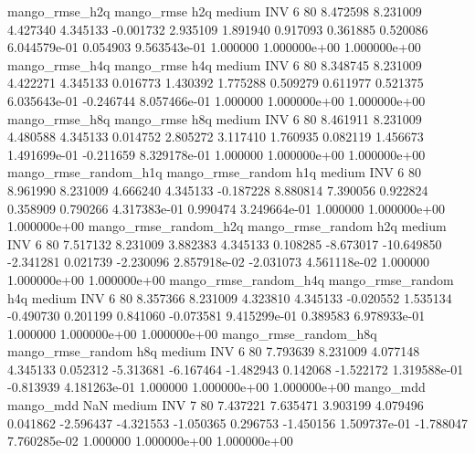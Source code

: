        mango_rmse_h2q        mango_rmse                  h2q     medium      INV                 6 80  8.472598       8.231009 4.427340       4.345133   -0.001732      2.935109      1.891940     0.917093       0.361885  0.520086 6.044579e-01     0.054903   9.563543e-01            1.000000    1.000000e+00        1.000000e+00
       mango_rmse_h4q        mango_rmse                  h4q     medium      INV                 6 80  8.348745       8.231009 4.422271       4.345133    0.016773      1.430392      1.775288     0.509279       0.611977  0.521375 6.035643e-01    -0.246744   8.057466e-01            1.000000    1.000000e+00        1.000000e+00
       mango_rmse_h8q        mango_rmse                  h8q     medium      INV                 6 80  8.461911       8.231009 4.480588       4.345133    0.014752      2.805272      3.117410     1.760935       0.082119  1.456673 1.491699e-01    -0.211659   8.329178e-01            1.000000    1.000000e+00        1.000000e+00
mango_rmse_random_h1q mango_rmse_random                  h1q     medium      INV                 6 80  8.961990       8.231009 4.666240       4.345133   -0.187228      8.880814      7.390056     0.922824       0.358909  0.790266 4.317383e-01     0.990474   3.249664e-01            1.000000    1.000000e+00        1.000000e+00
mango_rmse_random_h2q mango_rmse_random                  h2q     medium      INV                 6 80  7.517132       8.231009 3.882383       4.345133    0.108285     -8.673017    -10.649850    -2.341281       0.021739 -2.230096 2.857918e-02    -2.031073   4.561118e-02            1.000000    1.000000e+00        1.000000e+00
mango_rmse_random_h4q mango_rmse_random                  h4q     medium      INV                 6 80  8.357366       8.231009 4.323810       4.345133   -0.020552      1.535134     -0.490730     0.201199       0.841060 -0.073581 9.415299e-01     0.389583   6.978933e-01            1.000000    1.000000e+00        1.000000e+00
mango_rmse_random_h8q mango_rmse_random                  h8q     medium      INV                 6 80  7.793639       8.231009 4.077148       4.345133    0.052312     -5.313681     -6.167464    -1.482943       0.142068 -1.522172 1.319588e-01    -0.813939   4.181263e-01            1.000000    1.000000e+00        1.000000e+00
            mango_mdd         mango_mdd                  NaN     medium      INV                 7 80  7.437221       7.635471 3.903199       4.079496    0.041862     -2.596437     -4.321553    -1.050365       0.296753 -1.450156 1.509737e-01    -1.788047   7.760285e-02            1.000000    1.000000e+00        1.000000e+00
